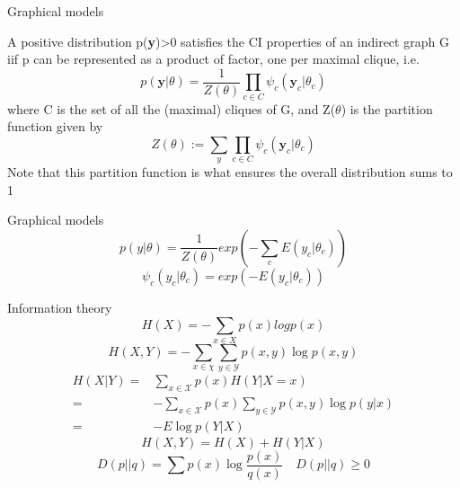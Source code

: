 \documentclass{beamer}
\begin{document}
\begin{frame}{Graphical models}
\begin{theorem}
A positive distribution p(\textbf{y})>0 satisfies the CI properties of an indirect graph G iif p can be represented as a product of factor, one per maximal clique,  i.e.
\begin{equation}
p(\textbf{y}|\theta)= \dfrac{1}{Z(\theta)}\prod_{c \in C }\psi_{c}(\textbf{y}_{c}|\theta_{c})
\end{equation}
where C is the set of all the (maximal) cliques of G,  and Z($\theta$) is the partition function given by 
\begin{equation}
Z(\theta):= \sum_{y}\prod_{c\in C}\psi_{c}(\textbf{y}_{c}|\theta_{c})
\end{equation}
Note that this partition function is what ensures the overall distribution sums to 1
\end{theorem}
\end{frame}
\begin{frame}{Graphical models}
\begin{equation}
p(y|\theta)=\dfrac{1}{Z(\theta)} exp\left(-\sum_{c}E(y_{c}|\theta_{c})\right)
\end{equation}
\begin{equation}
\psi_{c}(y_{c}|\theta_{c})=exp\left(-E(y_{c}|\theta_{c})\right)
\end{equation}
\end{frame}


\begin{frame}{Information theory}
\begin{equation}
H(X)=-\sum_{x \in X} p(x)log p(x)
\end{equation}
\begin{equation}
H(X,Y)=-\sum_{x\in \chi}\sum_{y\in \mathcal{Y}}p(x,y)\log p(x,y)
\end{equation}
\begin{equation}
\begin{split}
H(X|Y)=& \sum_{x\in \mathcal{X} }p(x)H(Y|X=x)\\
=& -\sum_{x\in \mathcal{X}}p(x)\sum_{y\in \mathcal{Y}}p(x,y)\log p(y|x) \\
=& -E\log p(Y|X)
\end{split}
\end{equation}
\begin{equation}
H(X,Y)=H(X)+H(Y|X)
\end{equation}
\begin{equation}
D(p||q)=\sum p(x)\log\frac{p(x)}{q(x)} \quad D(p||q)\geq 0
\end{equation}

\end{frame}
\end{document}
